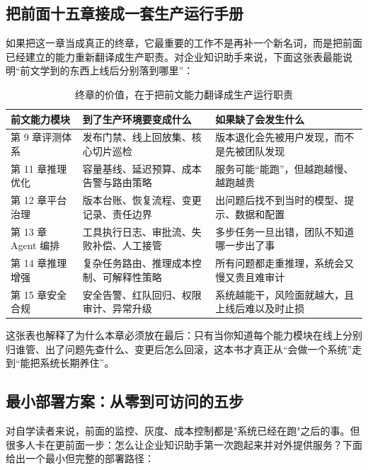 \subsection{把前面十五章接成一套生产运行手册}
如果把这一章当成真正的终章，它最重要的工作不是再补一个新名词，而是把前面已经建立的能力重新翻译成生产职责。对企业知识助手来说，下面这张表最能说明“前文学到的东西上线后分别落到哪里”：

\begin{table}[H]
\centering
\small
\begin{tabularx}{\textwidth}{>{\raggedright\arraybackslash}p{3.1cm}>{\raggedright\arraybackslash}p{4cm}>{\raggedright\arraybackslash}X}
\toprule
\textbf{前文能力模块} & \textbf{到了生产环境要变成什么} & \textbf{如果缺了会发生什么} \\
\midrule
第 9 章评测体系 & 发布门禁、线上回放集、核心切片巡检 & 版本退化会先被用户发现，而不是先被团队发现 \\
第 11 章推理优化 & 容量基线、延迟预算、成本告警与路由策略 & 服务可能“能跑”，但越跑越慢、越跑越贵 \\
第 12 章平台治理 & 版本台账、恢复流程、变更记录、责任边界 & 出问题后找不到当时的模型、提示、数据和配置 \\
第 13 章 Agent 编排 & 工具执行日志、审批流、失败补偿、人工接管 & 多步任务一旦出错，团队不知道哪一步出了事 \\
第 14 章推理增强 & 复杂任务路由、推理成本控制、可解释性策略 & 所有问题都走重推理，系统会又慢又贵且难审计 \\
第 15 章安全合规 & 安全告警、红队回归、权限审计、异常升级 & 系统越能干，风险面就越大，且上线后难以及时止损 \\
\bottomrule
\end{tabularx}
\caption{终章的价值，在于把前文能力翻译成生产运行职责}
\label{tab:book-to-production-ops}
\end{table}

这张表也解释了为什么本章必须放在最后：只有当你知道每个能力模块在线上分别归谁管、出了问题先查什么、变更后怎么回滚，这本书才真正从“会做一个系统”走到“能把系统长期养住”。

\subsection{最小部署方案：从零到可访问的五步}
对自学读者来说，前面的监控、灰度、成本控制都是"系统已经在跑"之后的事。但很多人卡在更前面一步：怎么让企业知识助手第一次跑起来并对外提供服务？下面给出一个最小但完整的部署路径：

